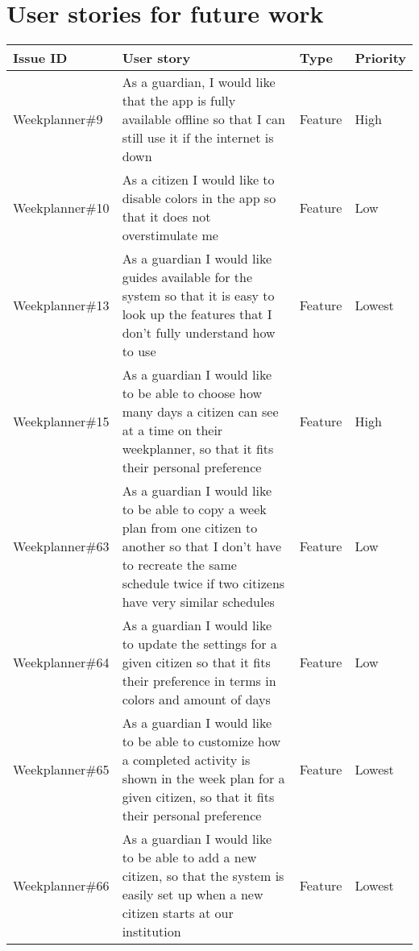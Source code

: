 \newpage
\section{User stories for future work}\label{appendix:future-work-user-stories}
\begin{longtable}{|p{2.9cm}|p{7cm}|p{1.4cm}|p{1.5cm}|}
    \hline
    Issue ID         & User story                                                                                                                                                                & Type & Priority     \\ \hline
    Weekplanner\#9   & As a guardian, I would like that the app is fully available offline so that I can still use it if the internet is down                                                    & Feature & High      \\ \hline
    Weekplanner\#10  & As a citizen I would like to disable colors in the app so that it does not overstimulate me                                                                               & Feature & Low      \\ \hline
    Weekplanner\#13  & As a guardian I would like guides available for the system so that it is easy to look up the features that I don't fully understand how to use                            & Feature & Lowest      \\ \hline
    Weekplanner\#15  & As a guardian I would like to be able to choose how many days a citizen can see at a time on their weekplanner, so that it fits their personal preference                 & Feature & High    \\ \hline
    Weekplanner\#63  & As a guardian I would like to be able to copy a week plan from one citizen to another so that I don’t have to recreate the same schedule twice if two citizens have very similar schedules  & Feature & Low  \\ \hline
    Weekplanner\#64  & As a guardian I would like to update the settings for a given citizen so that it fits their preference in terms in colors and amount of days                              & Feature & Low  \\ \hline
    Weekplanner\#65  & As a guardian I would like to be able to customize how a completed activity is shown in the week plan for a given citizen, so that it fits their personal preference      & Feature & Lowest  \\ \hline
    Weekplanner\#66  & As a guardian I would like to be able to add a new citizen, so that the system is easily set up when a new citizen starts at our institution                              & Feature & Lowest \\ \hline

\end{longtable}
